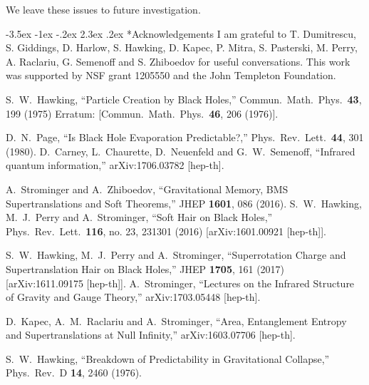 \documentclass[12pt]{article}
\makeatletter
\numberwithin{equation}{section}
\renewcommand\section{\@startsection {section}{1}{\z@}%
                                   {-3.5ex \@plus -1ex \@minus -.2ex}%
                                   {2.3ex \@plus.2ex}%
                                   {\normalfont\large\bfseries}}
\makeatother
\begin{document}
 
We leave these issues to future investigation. 


\section*{Acknowledgements}
I am   grateful  to T. Dumitrescu, S. Giddings, D. Harlow, S. Hawking, D. Kapec, P. Mitra, S. Pasterski, M. Perry, A. Raclariu, G. Semenoff and  S. Zhiboedov for useful conversations. This work was supported by NSF  grant  1205550 and the John Templeton Foundation.






\begin{thebibliography}{99}


  S.~W.~Hawking,
  ``Particle Creation by Black Holes,''
  Commun.\ Math.\ Phys.\  {\bf 43}, 199 (1975)
  Erratum: [Commun.\ Math.\ Phys.\  {\bf 46}, 206 (1976)].

 
  D.~N.~Page,
  ``Is Black Hole Evaporation Predictable?,''
  Phys.\ Rev.\ Lett.\  {\bf 44}, 301 (1980).
  D.~Carney, L.~Chaurette, D.~Neuenfeld and G.~W.~Semenoff,
  ``Infrared quantum information,''
  arXiv:1706.03782 [hep-th].

  A.~Strominger and A.~Zhiboedov,
  ``Gravitational Memory, BMS Supertranslations and Soft Theorems,''
  JHEP {\bf 1601}, 086 (2016).
  S.~W.~Hawking, M.~J.~Perry and A.~Strominger,
  ``Soft Hair on Black Holes,''
  Phys.\ Rev.\ Lett.\  {\bf 116}, no. 23, 231301 (2016)  [arXiv:1601.00921 [hep-th]].
  
  S.~W.~Hawking, M.~J.~Perry and A.~Strominger,
  ``Superrotation Charge and Supertranslation Hair on Black Holes,''
  JHEP {\bf 1705}, 161 (2017)
  [arXiv:1611.09175 [hep-th]].
  A.~Strominger,
  ``Lectures on the Infrared Structure of Gravity and Gauge Theory,''
  arXiv:1703.05448 [hep-th].
 
  D.~Kapec, A.~M.~Raclariu and A.~Strominger,
  ``Area, Entanglement Entropy and Supertranslations at Null Infinity,''
  arXiv:1603.07706 [hep-th].

  S.~W.~Hawking,
  ``Breakdown of Predictability in Gravitational Collapse,''
  Phys.\ Rev.\ D {\bf 14}, 2460 (1976).


\end{thebibliography}
\end{document}
